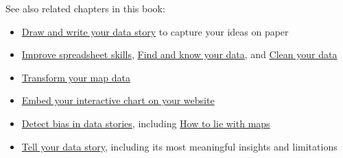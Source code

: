 \documentclass[
  english,
]{book}
\providecommand{\tightlist}{%
  \setlength{\itemsep}{0pt}\setlength{\parskip}{0pt}}
\begin{document}
See also related chapters in this book:

\begin{itemize}
\tightlist
\item
  \href{draw}{Draw and write your data story} to capture your ideas on paper
\item
  \href{spreadsheet}{Improve spreadsheet skills}, \href{find}{Find and know your data}, and \href{clean}{Clean your data}
\item
  \href{transform}{Transform your map data}
\item
  \href{embed}{Embed your interactive chart on your website}
\item
  \href{detect}{Detect bias in data stories}, including \href{how-to-lie-with-maps}{How to lie with maps}
\item
  \href{story}{Tell your data story}, including its most meaningful insights and limitations
\end{itemize}
\end{document}
